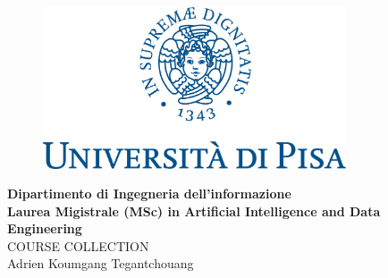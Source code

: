 \begin{titlepage} %
\begin{figure}[t] %
    \centering\includegraphics[width=0.80\textwidth]{marchio_unipi_pant541}\label{fig:figure-first-page}
\end{figure}

\vspace{20mm}

\begin{Large}
 \begin{center}
	\textbf{Dipartimento di Ingegneria dell'informazione\\ Laurea Migistrale (MSc) in Artificial Intelligence and Data Engineering\\}
	\vspace{5cm}
    {\LARGE{COURSE COLLECTION}}\\
	\vspace{5cm}
	{\Large{Adrien Koumgang Tegantchouang}}
\end{center}
\end{Large}

\vspace{15mm}



\end{titlepage}
